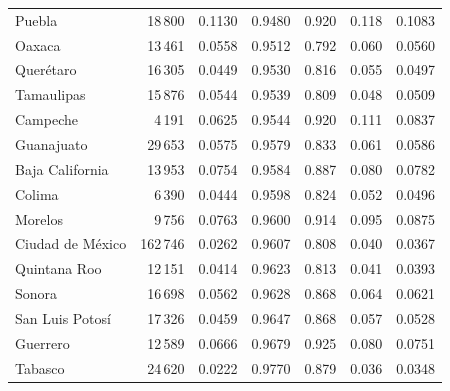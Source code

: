 \begin{longtable}{l r r r r r r}
Puebla & 18\,800 & 0.1130 & 0.9480 & 0.920 & 0.118 & 0.1083 \\
Oaxaca & 13\,461 & 0.0558 & 0.9512 & 0.792 & 0.060 & 0.0560 \\
Querétaro & 16\,305 & 0.0449 & 0.9530 & 0.816 & 0.055 & 0.0497 \\
Tamaulipas & 15\,876 & 0.0544 & 0.9539 & 0.809 & 0.048 & 0.0509 \\
Campeche & 4\,191 & 0.0625 & 0.9544 & 0.920 & 0.111 & 0.0837 \\
Guanajuato & 29\,653 & 0.0575 & 0.9579 & 0.833 & 0.061 & 0.0586 \\
Baja California & 13\,953 & 0.0754 & 0.9584 & 0.887 & 0.080 & 0.0782 \\
Colima & 6\,390 & 0.0444 & 0.9598 & 0.824 & 0.052 & 0.0496 \\
Morelos & 9\,756 & 0.0763 & 0.9600 & 0.914 & 0.095 & 0.0875 \\
Ciudad de México & 162\,746 & 0.0262 & 0.9607 & 0.808 & 0.040 & 0.0367 \\
Quintana Roo & 12\,151 & 0.0414 & 0.9623 & 0.813 & 0.041 & 0.0393 \\
Sonora & 16\,698 & 0.0562 & 0.9628 & 0.868 & 0.064 & 0.0621 \\
San Luis Potosí & 17\,326 & 0.0459 & 0.9647 & 0.868 & 0.057 & 0.0528 \\
Guerrero & 12\,589 & 0.0666 & 0.9679 & 0.925 & 0.080 & 0.0751 \\
Tabasco & 24\,620 & 0.0222 & 0.9770 & 0.879 & 0.036 & 0.0348 \\
\end{longtable}
\endgroup
